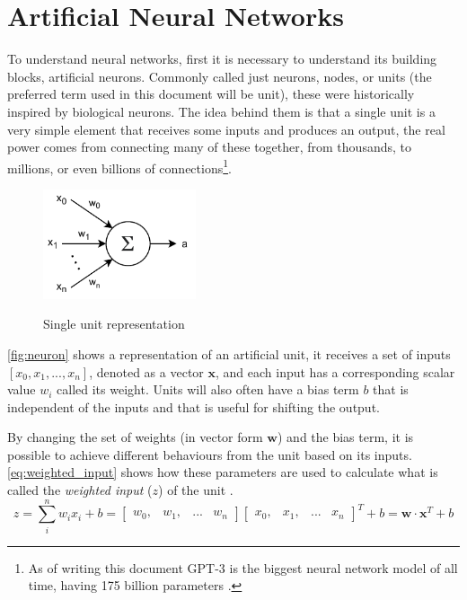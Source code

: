 \section{Artificial Neural Networks}
To understand neural networks, first it is necessary to understand its building blocks, artificial neurons. Commonly called just neurons, nodes, or units (the preferred term used in this document will be unit), these were historically inspired by biological neurons. The idea behind them is that a single unit is a very simple element that receives some inputs and produces an output, the real power comes from connecting many of these together, from thousands, to millions, or even billions of connections\footnote{
  As of writing this document GPT-3 is the biggest neural network model of all time, having 175 billion parameters \cite{gpt3_2020}.
}.
\begin{figure}[hbt]
    \centering
    \caption{Single unit representation}
    \includegraphics[width=0.4\textwidth]{chapters/NeuralNets/figures/neuron.pdf}
    \label{fig:neuron}
\end{figure}

\autoref{fig:neuron} shows a representation of an artificial unit, it receives a set of inputs $[x_0, x_1, ..., x_n]$, denoted as a vector $\bm{x}$, and each input has a corresponding scalar value $w_i$ called its weight. Units will also often have a bias term $b$ that is independent of the inputs and that is useful for shifting the output.

By changing the set of weights (in vector form $\bm{w}$) and the bias term, it is possible to achieve different behaviours from the unit based on its inputs. \autoref{eq:weighted_input} shows how these parameters are used to calculate what is called the \textit{weighted input} ($z$) of the unit \cite[Chapter 2]{NN&DL2015}.
\begin{equation} \label{eq:weighted_input}
    z = \sum_{i}^{n}{w_i x_i} + b =
    \begin{bmatrix}w_0, & w_1, & ... & w_n\end{bmatrix}
    \begin{bmatrix}x_0, & x_1, & ... & x_n\end{bmatrix}^T + b =
    \bm{w} \cdot \bm{x}^T + b
\end{equation}

